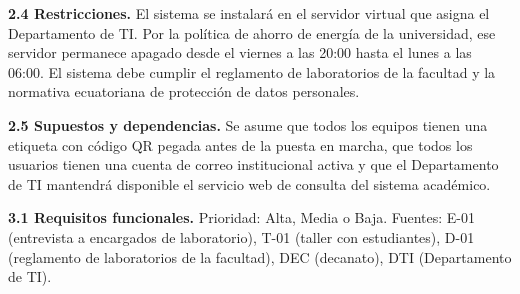 \documentclass[11pt]{article}
\begin{document}
\textbf{2.4 Restricciones.} El sistema se instalará en el servidor virtual que asigna el Departamento de TI. Por la política de ahorro de energía de la universidad, ese servidor permanece apagado desde el viernes a las 20:00 hasta el lunes a las 06:00. El sistema debe cumplir el reglamento de laboratorios de la facultad y la normativa ecuatoriana de protección de datos personales.

\textbf{2.5 Supuestos y dependencias.} Se asume que todos los equipos tienen una etiqueta con código QR pegada antes de la puesta en marcha, que todos los usuarios tienen una cuenta de correo institucional activa y que el Departamento de TI mantendrá disponible el servicio web de consulta del sistema académico.

\par\vspace{4pt}

\textbf{3.1 Requisitos funcionales.} Prioridad: Alta, Media o Baja. Fuentes: E-01 (entrevista a encargados de laboratorio), T-01 (taller con estudiantes), D-01 (reglamento de laboratorios de la facultad), DEC (decanato), DTI (Departamento de TI).
\end{document}
